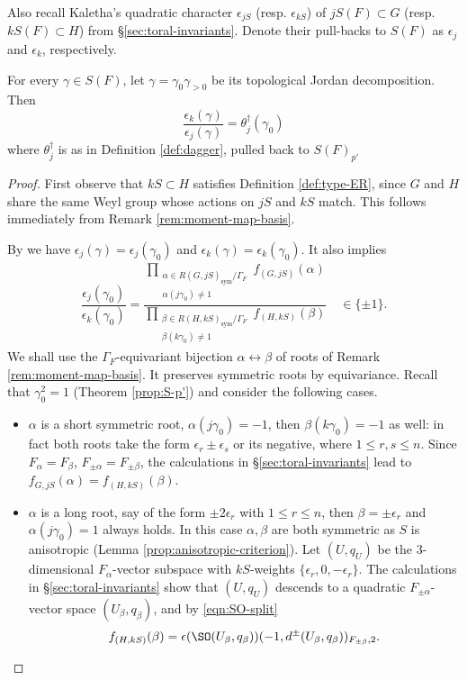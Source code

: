 \documentclass[a4paper,10pt]{article}
\begin{document}
Also recall Kaletha's quadratic character $\epsilon_{jS}$ (resp. $\epsilon_{kS}$) of $jS(F) \subset G$ (resp. $kS(F) \subset H$) from \S\ref{sec:toral-invariants}. Denote their pull-backs to $S(F)$ as $\epsilon_j$ and $\epsilon_k$, respectively.

\begin{theorem}\label{prop:interplay}
	For every $\gamma \in S(F)$, let $\gamma = \gamma_0 \gamma_{>0}$ be its topological Jordan decomposition. Then
	\[ \dfrac{\epsilon_k(\gamma)}{\epsilon_j(\gamma)} = \theta^\dagger_j(\gamma_0) \]
	where $\theta^\dagger_j$ is as in Definition \ref{def:dagger}, pulled back to $S(F)_{p'}$
\end{theorem}
\begin{proof}
	First observe that $kS \subset H$ satisfies Definition \ref{def:type-ER}, since $G$ and $H$ share the same Weyl group whose actions on $jS$ and $kS$ match. This follows immediately from Remark \ref{rem:moment-map-basis}.
	
	By \cite[Lemma 4.12]{Kal15} we have $\epsilon_j(\gamma) = \epsilon_j(\gamma_0)$ and $\epsilon_k(\gamma) = \epsilon_k(\gamma_0)$. It also implies
	\begin{gather*}
		\dfrac{\epsilon_j(\gamma_0)}{\epsilon_k(\gamma_0)} = \dfrac{ \displaystyle\prod_{\substack{ \alpha \in R(G, jS)_\text{sym} / \Gamma_F \\ \alpha(j\gamma_0) \neq 1 }} f_{(G,jS)}(\alpha) }{ \displaystyle\prod_{\substack{ \beta \in R(H, kS)_\text{sym} / \Gamma_F \\ \beta(k\gamma_0) \neq 1 }} f_{(H,kS)}(\beta) } \quad \in \{\pm 1\}.
	\end{gather*}
	We shall use the $\Gamma_F$-equivariant bijection $\alpha \leftrightarrow \beta$ of roots of Remark \ref{rem:moment-map-basis}. It preserves symmetric roots by equivariance. Recall that $\gamma_0^2 = 1$ (Theorem \ref{prop:S-p'}) and consider the following cases.
	\begin{itemize}
		\item $\alpha$ is a short symmetric root, $\alpha(j\gamma_0) = -1$, then $\beta(k\gamma_0) = -1$ as well: in fact both roots take the form $\epsilon_r \pm \epsilon_s$ or its negative, where $1 \leq r,s \leq n$. Since $F_\alpha = F_\beta$, $F_{\pm\alpha} = F_{\pm\beta}$, the calculations in \S\ref{sec:toral-invariants} lead to $f_{G,jS}(\alpha) = f_{(H,kS)}(\beta)$.
		\item $\alpha$ is a long root, say of the form $\pm 2\epsilon_r$ with $1 \leq r \leq n$, then $\beta = \pm\epsilon_r$ and $\alpha(j\gamma_0) = 1$ always holds. In this case $\alpha, \beta$ are both symmetric as $S$ is anisotropic (Lemma \ref{prop:anisotropic-criterion}). Let $(U, q_U)$ be the $3$-dimensional $F_\alpha$-vector subspace with $kS$-weights $\{\epsilon_r, 0, -\epsilon_r \}$. The calculations in \S\ref{sec:toral-invariants} show that $(U, q_U)$ descends to a quadratic $F_{\pm\alpha}$-vector space $(U_\beta, q_\beta)$, and by \eqref{eqn:SO-split}
		\[ f_{(H, kS)}(\beta) = \epsilon(\SO(U_\beta, q_\beta)) (-1, d^\pm(U_\beta, q_\beta))_{F_{\pm\beta}, 2}. \]
	\end{itemize}


\end{proof}
\end{document}
